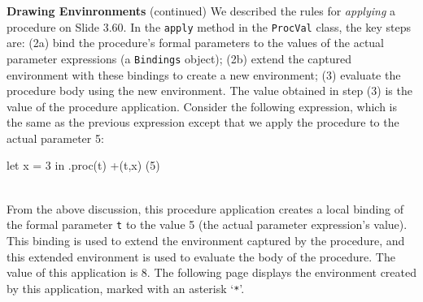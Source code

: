\begin{minipage}[t]{\sw}
\slidenumber
\LARGE
{\bf Drawing Envinronments} (continued)\exx
We described the rules for {\em applying} a procedure on Slide 3.60.
In the \verb'apply' method in the \verb'ProcVal' class, 
the key steps are:
(2a) bind the procedure's formal parameters
to the values of the actual parameter expressions
(a \verb'Bindings' object);
(2b)
extend the captured environment
with these bindings to create a new environment;
(3) evaluate the procedure body
using the new environment.
The value obtained in step (3) is the value of the procedure application.\exx
Consider the following expression,
which is the same as the previous expression except
that we apply the procedure to the actual parameter 5:\\[1.5ex]
\Large
\begin{verbbox}
let
  x = 3
in
  .proc(t) +(t,x) (5)
\end{verbbox}
\emm\theverbbox\\[1.5ex]
\LARGE
From the above discussion,
this procedure application creates a local binding
of the formal parameter \verb't' to the value 5
(the actual parameter expression's value).
This binding is used to extend the environment captured
by the procedure,
and this extended environment is used
to evaluate the body of the procedure.
The value of this application is 8.\exx
The following page displays the environment created by this application,
marked with an asterisk `\verb'*''.
\end{minipage}
\clearpage
